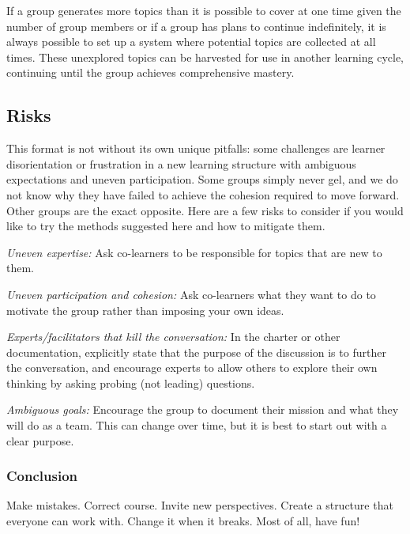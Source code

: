If a group generates more topics than it is possible to cover at one
time given the number of group members or if a group has plans to
continue indefinitely, it is always possible to set up a system where
potential topics are collected at all times. These unexplored topics can
be harvested for use in another learning cycle, continuing until the
group achieves comprehensive mastery.

\subsection{Risks}

This format is not without its own unique pitfalls: some challenges are
learner disorientation or frustration in a new learning structure with
ambiguous expectations and uneven participation. Some groups simply
never gel, and we do not know why they have failed to achieve the
cohesion required to move forward. Other groups are the exact opposite.
Here are a few risks to consider if you would like to try the methods
suggested here and how to mitigate them.

\emph{Uneven expertise:} Ask co-learners to be responsible for topics
that are new to them.

\emph{Uneven participation and cohesion:} Ask co-learners what they want
to do to motivate the group rather than imposing your own ideas.

\emph{Experts/facilitators that kill the conversation:} In the charter
or other documentation, explicitly state that the purpose of the
discussion is to further the conversation, and encourage experts to
allow others to explore their own thinking by asking probing (not
leading) questions.

\emph{Ambiguous goals:} Encourage the group to document their mission
and what they will do as a team. This can change over time, but it is
best to start out with a clear purpose.

\subsubsection{Conclusion}

Make mistakes. Correct course. Invite new perspectives. Create a
structure that everyone can work with. Change it when it breaks. Most of
all, have fun!
